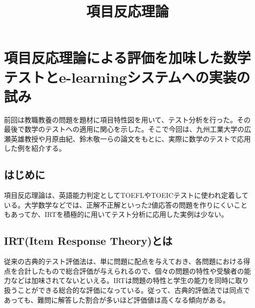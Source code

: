 \documentclass[12pt]{jarticle}
\title{項目反応理論}
\begin{document}
\maketitle
\section{項目反応理論による評価を加味した数学テストとe-learningシステムへの実装の試み}
前回は教職教養の問題を題材に項目特性図を用いて、テスト分析を行った。その最後で数学のテストへの適用に関心を示した。そこで今回は、九州工業大学の広瀬英雄教授や月原由紀、鈴木敬一らの論文をもとに、実際に数学のテストで応用した例を紹介する。%
\subsection{はじめに}
項目反応理論は、英語能力判定としてTOEFLやTOEICテストに使われ定着している。大学数学などでは、正解不正解といった$2$値応答の問題を作りにくいこともあってか、IRTを積極的に用いてテスト分析に応用した実例は少ない。
\subsection{IRT(Item Response Theory)とは}
従来の古典的テスト評価法は、単に問題に配点を与えておき、各問題における得点を合計したもので総合評価が与えられるので、個々の問題の特性や受験者の能力などは加味されてないといえる。IRTは問題の特性と学生の能力を同時に取り扱うことができる総合的な評価になっている。従って、古典的評価法では同点であっても、難問に解答した割合が多いほど評価値は高くなる傾向がある。
\end{document}
